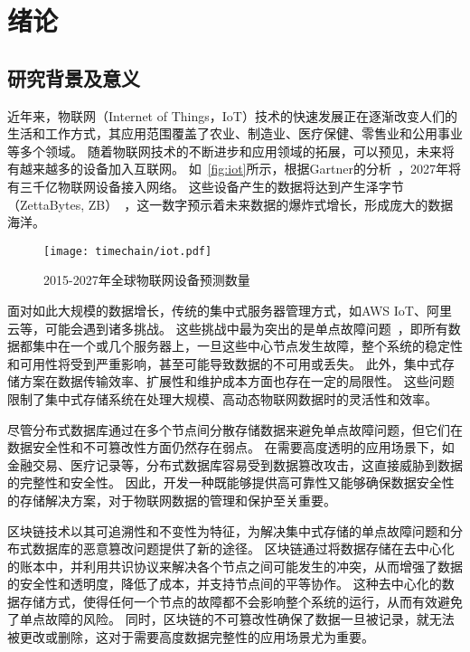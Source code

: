 
\chapter{绪论}
\section{研究背景及意义}
近年来，物联网（Internet of Things，IoT）技术的快速发展正在逐渐改变人们的生活和工作方式，其应用范围覆盖了农业、制造业、医疗保健、零售业和公用事业等多个领域。
随着物联网技术的不断进步和应用领域的拓展，可以预见，未来将有越来越多的设备加入互联网。
如~\autoref{fig:iot}所示，根据Gartner的分析~\cite{hung2017leading}，2027年将有三千亿物联网设备接入网络。
这些设备产生的数据将达到产生泽字节（ZettaBytes, ZB）~\cite{al2020internet}，这一数字预示着未来数据的爆炸式增长，形成庞大的数据海洋。

\begin{figure}[t]
    \centering
    \texttt{[image: timechain/iot.pdf]}
    \caption{2015-2027年全球物联网设备预测数量}
    \label{fig:iot}
\end{figure}

面对如此大规模的数据增长，传统的集中式服务器管理方式，如AWS IoT、阿里云等，可能会遇到诸多挑战。
这些挑战中最为突出的是单点故障问题~\cite{gill2011understanding}，即所有数据都集中在一个或几个服务器上，一旦这些中心节点发生故障，整个系统的稳定性和可用性将受到严重影响，甚至可能导致数据的不可用或丢失。
此外，集中式存储方案在数据传输效率、扩展性和维护成本方面也存在一定的局限性。
这些问题限制了集中式存储系统在处理大规模、高动态物联网数据时的灵活性和效率。

尽管分布式数据库通过在多个节点间分散存储数据来避免单点故障问题，但它们在数据安全性和不可篡改性方面仍然存在弱点。
在需要高度透明的应用场景下，如金融交易、医疗记录等，分布式数据库容易受到数据篡改攻击，这直接威胁到数据的完整性和安全性。
因此，开发一种既能够提供高可靠性又能够确保数据安全性的存储解决方案，对于物联网数据的管理和保护至关重要。

区块链技术以其可追溯性和不变性为特征，为解决集中式存储的单点故障问题和分布式数据库的恶意篡改问题提供了新的途径。
区块链通过将数据存储在去中心化的账本中，并利用共识协议来解决各个节点之间可能发生的冲突，从而增强了数据的安全性和透明度，降低了成本，并支持节点间的平等协作。
这种去中心化的数据存储方式，使得任何一个节点的故障都不会影响整个系统的运行，从而有效避免了单点故障的风险。
同时，区块链的不可篡改性确保了数据一旦被记录，就无法被更改或删除，这对于需要高度数据完整性的应用场景尤为重要。

